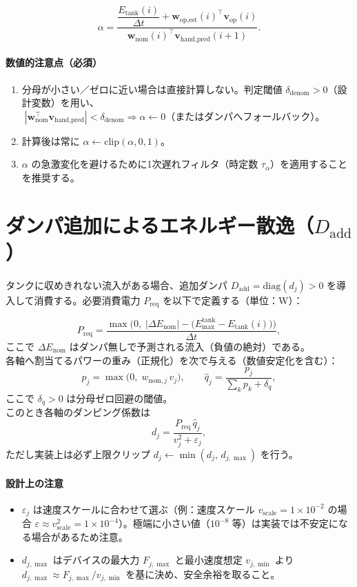 \documentclass[a4paper,11pt]{article}
\begin{document}
\[
  \alpha = \frac{\dfrac{E_{\text{tank}}(i)}{\Delta t} + \bm{w}_{\text{op,est}}(i)^\top \bm{v}_{\text{op}}(i)}
               {\bm{w}_{\text{nom}}(i)^\top \bm{v}_{\text{hand,pred}}(i+1)}.
\]

\paragraph{数値的注意点（必須）}
\begin{enumerate}[label=(\alph*)]
  \item 分母が小さい／ゼロに近い場合は直接計算しない。判定閾値 $\delta_{\text{denom}}>0$（設計変数）を用い、\\
    \(\;|\bm{w}_{\text{nom}}^\top \bm{v}_{\text{hand,pred}}| < \delta_{\text{denom}}\Rightarrow \alpha \leftarrow 0\)（またはダンパへフォールバック）。
  \item 計算後は常に $\alpha \leftarrow \mathrm{clip}(\alpha,0,1)$。
  \item $\alpha$ の急激変化を避けるために1次遅れフィルタ（時定数 $\tau_\alpha$）を適用することを推奨する。
\end{enumerate}

\section{ダンパ追加によるエネルギー散逸（$D_{\text{add}}$）}
タンクに収めきれない流入がある場合、追加ダンパ $D_{\text{add}}=\mathrm{diag}(d_j)>0$ を導入して消費する。必要消費電力 $P_{\text{req}}$ を以下で定義する（単位：W）：

\[
  P_{\text{req}} = \frac{ \max\big(0,\; |\Delta E_{\text{nom}}| - \big(E_{\max}^{\text{tank}} - E_{\text{tank}}(i)\big)\big)}{\Delta t},
\]
ここで $\Delta E_{\text{nom}}$ はダンパ無しで予測される流入（負値の絶対）である。\\

各軸へ割当てるパワーの重み（正規化）を次で与える（数値安定化を含む）：
\[
  p_j = \max\big(0,\; w_{\text{nom},j}\, v_j\big),\qquad
  \hat q_j = \frac{p_j}{\sum_k p_k + \delta_q},
\]
ここで $\delta_q>0$ は分母ゼロ回避の閾値。\\

このとき各軸のダンピング係数は
\[
  d_j = \frac{P_{\text{req}}\,\hat q_j}{v_j^2 + \varepsilon_j},
\]
ただし実装上は必ず上限クリップ $d_j \leftarrow \min(d_j,\, d_{j,\max})$ を行う。\\

\paragraph{設計上の注意}
\begin{itemize}
  \item $\varepsilon_j$ は速度スケールに合わせて選ぶ（例：速度スケール $v_{\text{scale}}\!=\!1\times10^{-2}$ の場合 $\varepsilon \approx v_{\text{scale}}^2 = 1\times10^{-4}$）。極端に小さい値（$10^{-8}$ 等）は実装では不安定になる場合があるため注意。
  \item $d_{j,\max}$ はデバイスの最大力 $F_{j,\max}$ と最小速度想定 $v_{j,\min}$ より $d_{j,\max}\approx F_{j,\max}/v_{j,\min}$ を基に決め、安全余裕を取ること。
\end{itemize}
\end{document}
